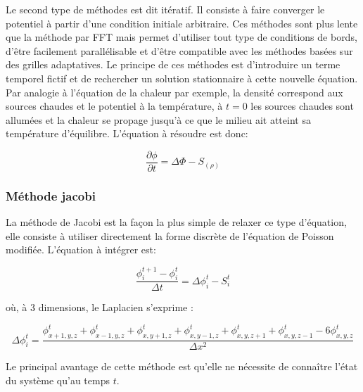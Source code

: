 Le second type de méthodes est dit itératif. 
Il consiste à faire converger le potentiel à partir d'une condition initiale arbitraire. 
Ces méthodes sont plus lente que la méthode par FFT mais permet d'utiliser tout type de conditions de bords, d'être facilement parallélisable et d'être compatible avec les méthodes basées sur des grilles adaptatives.
Le principe de ces méthodes est d'introduire un terme temporel fictif et de rechercher un solution stationnaire à cette nouvelle équation.
Par analogie à l'équation de la chaleur par exemple, la densité correspond aux sources chaudes et le potentiel à la température, à $t=0$ les sources chaudes sont allumées et la chaleur se propage jusqu'à ce que le milieu ait atteint sa température d'équilibre. 
L'équation à résoudre est donc:

\begin{equation}
\dfrac{\partial \phi}{\partial t} = \Delta \Phi -S_{(\rho)}
\end{equation}



\subsubsection{Méthode jacobi}

La méthode de Jacobi est la façon la plus simple de relaxer ce type d'équation, elle consiste à utiliser directement la forme discrète de l'équation de Poisson modifiée. 
L'équation à intégrer est:

\[ \dfrac{\phi^{t+1}_i - \phi^{t}_i}{\Delta t}  =  \Delta \phi_i^t - S_i^t \]

où, à 3 dimensions, le Laplacien s'exprime :

\[ \Delta \phi_i^t = \dfrac{\phi_{x+1,y,z}^t  + \phi_{x-1,y,z}^t + \phi_{x,y+1,z}^t  + \phi_{x,y-1,z}^t + \phi_{x,y,z+1}^t + \phi_{x,y,z-1}^t	- 6\phi_{x,y,z}^t}{\Delta x ^2} \]
		
Le principal avantage de cette méthode est qu'elle ne nécessite de connaître l'état du système qu'au temps $t$.

